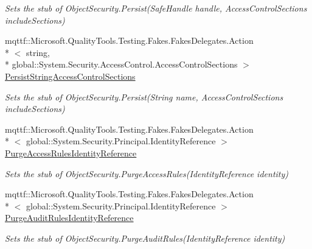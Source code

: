 \begin{DoxyCompactItemize}
\begin{DoxyCompactList}\small\item\em Sets the stub of Object\-Security.\-Persist(\-Safe\-Handle handle, Access\-Control\-Sections include\-Sections)\end{DoxyCompactList}\item 
mqttf\-::\-Microsoft.\-Quality\-Tools.\-Testing.\-Fakes.\-Fakes\-Delegates.\-Action\\*
$<$ string, \\*
global\-::\-System.\-Security.\-Access\-Control.\-Access\-Control\-Sections $>$ \hyperlink{class_system_1_1_security_1_1_access_control_1_1_fakes_1_1_stub_directory_object_security_a11bbaf59fc499a91374f3978f8b3fda3}{Persist\-String\-Access\-Control\-Sections}
\begin{DoxyCompactList}\small\item\em Sets the stub of Object\-Security.\-Persist(\-String name, Access\-Control\-Sections include\-Sections)\end{DoxyCompactList}\item 
mqttf\-::\-Microsoft.\-Quality\-Tools.\-Testing.\-Fakes.\-Fakes\-Delegates.\-Action\\*
$<$ global\-::\-System.\-Security.\-Principal.\-Identity\-Reference $>$ \hyperlink{class_system_1_1_security_1_1_access_control_1_1_fakes_1_1_stub_directory_object_security_aa650e68136a900fd7870e67fb2aced68}{Purge\-Access\-Rules\-Identity\-Reference}
\begin{DoxyCompactList}\small\item\em Sets the stub of Object\-Security.\-Purge\-Access\-Rules(\-Identity\-Reference identity)\end{DoxyCompactList}\item 
mqttf\-::\-Microsoft.\-Quality\-Tools.\-Testing.\-Fakes.\-Fakes\-Delegates.\-Action\\*
$<$ global\-::\-System.\-Security.\-Principal.\-Identity\-Reference $>$ \hyperlink{class_system_1_1_security_1_1_access_control_1_1_fakes_1_1_stub_directory_object_security_aed9efdda7be679589e1d0de7a8d56eef}{Purge\-Audit\-Rules\-Identity\-Reference}
\begin{DoxyCompactList}\small\item\em Sets the stub of Object\-Security.\-Purge\-Audit\-Rules(\-Identity\-Reference identity)\end{DoxyCompactList}\end{DoxyCompactItemize}
